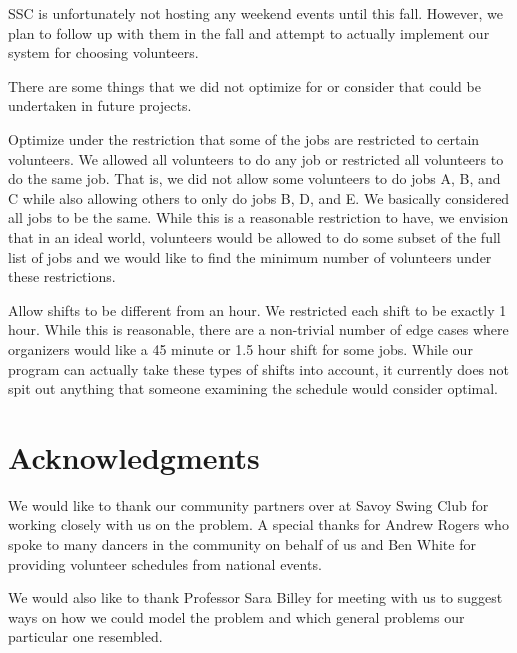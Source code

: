 \documentclass[11pt]{article}
\theoremstyle{definition}
\begin{document}
\begin{multicols}{2}
SSC is unfortunately not hosting any weekend events until this fall.
However, we plan to follow up with them in the fall and attempt to actually implement our system for choosing volunteers.

There are some things that we did not optimize for or consider that could be undertaken in future projects.

Optimize under the restriction that some of the jobs are restricted to certain volunteers.
We allowed all volunteers to do any job or restricted all volunteers to do the same job.
That is, we did not allow some volunteers to do jobs A, B, and C while also allowing others to only do jobs B, D, and E.
We basically considered all jobs to be the same.
While this is a reasonable restriction to have, we envision that in an ideal world, volunteers would be allowed to do some subset of the full list of jobs and we would like to find the minimum number of volunteers under these restrictions.

Allow shifts to be different from an hour.
We restricted each shift to be exactly 1 hour.
While this is reasonable, there are a non-trivial number of edge cases where organizers would like a 45 minute or 1.5 hour shift for some jobs.
While our program can actually take these types of shifts into account, it currently does not spit out anything that someone examining the schedule would consider optimal.

\section{Acknowledgments}
We would like to thank our community partners over at Savoy Swing Club for working closely with us on the problem. A special thanks for Andrew Rogers who spoke to many dancers in the community on behalf of us and Ben White for providing volunteer schedules from national events.

We would also like to thank Professor Sara Billey for meeting with us to suggest ways
on how we could model the problem and which general problems our particular one resembled.


\end{multicols}
\end{document}
